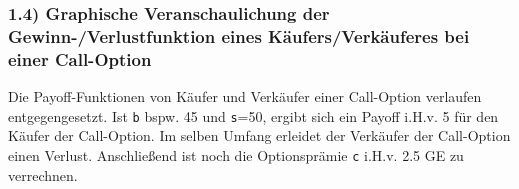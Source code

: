 \documentclass[paper=landscape]{scrartcl}
\begin{document}
    \hypertarget{graphische-veranschaulichung-der-gewinn-verlustfunktion-eines-kuxe4ufersverkuxe4uferes-bei-einer-call-option}{%
\subsubsection{1.4) Graphische Veranschaulichung der
Gewinn-/Verlustfunktion eines Käufers/Verkäuferes bei einer
Call-Option}\label{graphische-veranschaulichung-der-gewinn-verlustfunktion-eines-kuxe4ufersverkuxe4uferes-bei-einer-call-option}}

Die Payoff-Funktionen von Käufer und Verkäufer einer Call-Option
verlaufen entgegengesetzt. Ist \texttt{b} bspw. 45 und \texttt{s}=50,
ergibt sich ein Payoff i.H.v. 5 für den Käufer der Call-Option. Im
selben Umfang erleidet der Verkäufer der Call-Option einen Verlust.
Anschließend ist noch die Optionsprämie \texttt{c} i.H.v. 2.5 GE zu
verrechnen.
\end{document}
